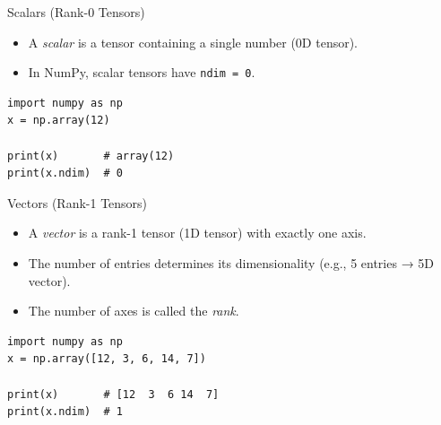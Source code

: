 \documentclass{beamer}
\begin{document}
\begin{frame}[fragile]{Scalars (Rank-0 Tensors)}
    \begin{itemize}
        \item A \textit{scalar} is a tensor containing a single number (0D tensor).
        \item In NumPy, scalar tensors have \texttt{ndim = 0}.
    \end{itemize}

    \begin{center}
        \begin{tcolorbox}[
                width=0.7\textwidth,
                colback=gray!5,
                colframe=gray!60,
                boxrule=0.4pt,
                arc=3pt,
                left=4pt,right=4pt,top=4pt,bottom=4pt
            ]
            \begin{verbatim}
import numpy as np
x = np.array(12)

print(x)       # array(12)
print(x.ndim)  # 0
\end{verbatim}
        \end{tcolorbox}
    \end{center}
\end{frame}

\begin{frame}[fragile]{Vectors (Rank-1 Tensors)}
    \begin{itemize}
        \item A \textit{vector} is a rank-1 tensor (1D tensor) with exactly one axis.
        \item The number of entries determines its dimensionality (e.g., 5 entries → 5D vector).
        \item The number of axes is called the \textit{rank}.
    \end{itemize}

    \begin{center}
        \begin{tcolorbox}[
                width=0.7\textwidth,
                colback=gray!5,
                colframe=gray!60,
                boxrule=0.4pt,
                arc=3pt,
                left=6pt,right=6pt,top=6pt,bottom=6pt
            ]
            \begin{verbatim}
import numpy as np
x = np.array([12, 3, 6, 14, 7])

print(x)       # [12  3  6 14  7]
print(x.ndim)  # 1
\end{verbatim}
        \end{tcolorbox}
    \end{center}

\end{frame}
\end{document}
